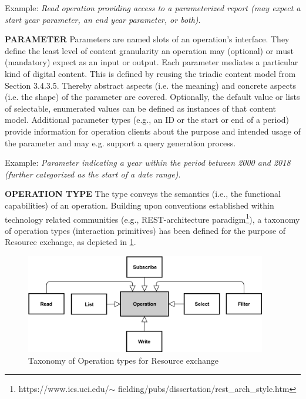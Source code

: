 Example: \textit{Read operation providing access to a parameterized report (may expect a start year parameter, an end year parameter, or both)}. 

\textbf{PARAMETER} Parameters are named slots of an operation’s interface. They define the least level of content granularity an operation may (optional) or must (mandatory) expect as an input or output. Each parameter mediates a particular kind of digital content. This is defined by reusing the triadic content model from Section 3.4.3.5. Thereby abstract aspects (i.e. the meaning) and concrete aspects (i.e. the shape) of the parameter are covered. Optionally, the default value or lists of selectable, enumerated values can be defined as instances of that content model. Additional parameter types (e.g., an ID or the start or end of a period) provide information for operation clients about the purpose and intended usage of the parameter and may e.g. support a query generation process. 

Example: \textit{Parameter indicating a year within the period between 2000 and 2018 (further categorized as the start of a date range)}. 

\textbf{OPERATION TYPE} The type conveys the semantics (i.e., the functional capabilities) of an operation. Building upon conventions established within technology related communities (e.g., REST-architecture paradigm\footnote{https://www.ics.uci.edu/$ \sim $ fielding/pubs/dissertation/rest\_arch\_style.htm }), a taxonomy of operation types (interaction primitives) has been defined for the purpose of Resource exchange, as depicted in \ref{fig:Taxonomy_of_Operation_types_for_Resource_exchange}. 




\begin{figure}[H]
	\begin{Center}
		\includegraphics[width=4.15in,height=1.7in]{./media/image40.png}
		\caption{Taxonomy of Operation types for Resource exchange}
		\label{fig:Taxonomy_of_Operation_types_for_Resource_exchange}
	\end{Center}
\end{figure}


